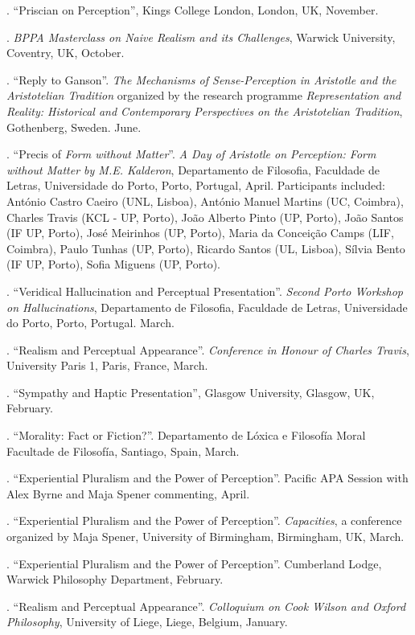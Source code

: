 \documentclass[11pt]{article}
\begin{document}
. ``Priscian on Perception'', Kings College London, London, UK, November.

. \emph{BPPA Masterclass on Naive Realism and its Challenges}, Warwick University, Coventry, UK, October.

. ``Reply to Ganson''. \emph{The Mechanisms of Sense-Perception in Aristotle and the Aristotelian Tradition} organized by the research programme
\emph{Representation and Reality: Historical and Contemporary Perspectives on the Aristotelian Tradition}, Gothenberg, Sweden. June.

. ``Precis of \emph{Form without Matter}''. \emph{A Day of Aristotle on Perception: Form without Matter by M.E. Kalderon}, Departamento de Filosofia, Faculdade de Letras, Universidade do Porto, Porto, Portugal, April. Participants included: António Castro Caeiro (UNL, Lisboa), António Manuel Martins (UC, Coimbra), Charles Travis (KCL - UP, Porto), João Alberto Pinto (UP, Porto), João Santos (IF UP, Porto), José Meirinhos (UP, Porto), Maria da Conceição Camps (LIF, Coimbra), Paulo Tunhas (UP, Porto), Ricardo Santos (UL, Lisboa), Sílvia Bento (IF UP, Porto), Sofia Miguens (UP, Porto).

. ``Veridical Hallucination and Perceptual Presentation''. \emph{Second Porto Workshop on Hallucinations}, Departamento de Filosofia, Faculdade de Letras, Universidade do Porto, Porto, Portugal. March.

. ``Realism and Perceptual Appearance''. \emph{Conference in Honour of Charles Travis}, University Paris 1, Paris, France, March.

. ``Sympathy and Haptic Presentation'', Glasgow University, Glasgow, UK, February.

. ``Morality: Fact or Fiction?''. Departamento de Lóxica e Filosofía Moral
Facultade de Filosofía, Santiago, Spain, March.

. ``Experiential Pluralism and the Power of Perception''. Pacific APA Session with Alex Byrne and Maja Spener commenting, April.

. ``Experiential Pluralism and the Power of Perception''. \emph{Capacities}, a conference organized by Maja Spener, University of Birmingham, Birmingham, UK, March.

. ``Experiential Pluralism and the Power of Perception''. Cumberland Lodge, Warwick Philosophy Department, February.

. ``Realism and Perceptual Appearance''. \emph{Colloquium on Cook Wilson and Oxford Philosophy}, University of Liege, Liege, Belgium, January.
\end{document}

